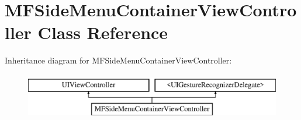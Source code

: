 \hypertarget{interface_m_f_side_menu_container_view_controller}{\section{M\-F\-Side\-Menu\-Container\-View\-Controller Class Reference}
\label{interface_m_f_side_menu_container_view_controller}
}
Inheritance diagram for M\-F\-Side\-Menu\-Container\-View\-Controller\-:\begin{figure}[H]
\begin{center}
\leavevmode
\includegraphics[height=2.000000cm]{interface_m_f_side_menu_container_view_controller}
\end{center}
\end{figure}
